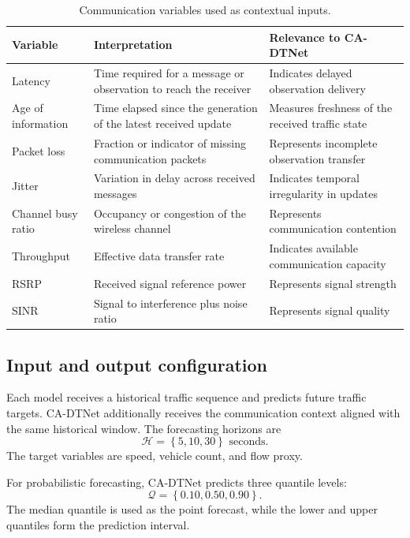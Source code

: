 \documentclass[pdflatex,sn-mathphys-num]{sn-jnl}%
\theoremstyle{thmstyleone}%
\theoremstyle{thmstyletwo}%
\theoremstyle{thmstylethree}%
\begin{document}
\begin{table}[htbp]
\centering
\caption{Communication variables used as contextual inputs.}
\label{tab:communication_variables}
\small
\begin{tabularx}{\linewidth}{p{2.5cm} X p{3.0cm}}
\hline
Variable & Interpretation & Relevance to CA-DTNet \\
\hline
Latency & Time required for a message or observation to reach the receiver & Indicates delayed observation delivery \\
Age of information & Time elapsed since the generation of the latest received update & Measures freshness of the received traffic state \\
Packet loss & Fraction or indicator of missing communication packets & Represents incomplete observation transfer \\
Jitter & Variation in delay across received messages & Indicates temporal irregularity in updates \\
Channel busy ratio & Occupancy or congestion of the wireless channel & Represents communication contention \\
Throughput & Effective data transfer rate & Indicates available communication capacity \\
RSRP & Received signal reference power & Represents signal strength \\
SINR & Signal to interference plus noise ratio & Represents signal quality \\
\hline
\end{tabularx}
\end{table}

\subsection{Input and output configuration}
\label{subsec:input_output_configuration}

Each model receives a historical traffic sequence and predicts future traffic targets. CA-DTNet additionally receives the communication context aligned with the same historical window. The forecasting horizons are
\begin{equation}
    \mathcal{H}
    =
    \left\{5, 10, 30\right\}
    \text{ seconds}.
\end{equation}
The target variables are speed, vehicle count, and flow proxy.

For probabilistic forecasting, CA-DTNet predicts three quantile levels:
\begin{equation}
    \mathcal{Q}
    =
    \left\{0.10, 0.50, 0.90\right\}.
\end{equation}
The median quantile is used as the point forecast, while the lower and upper quantiles form the prediction interval.
\end{document}
